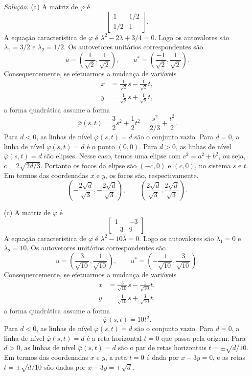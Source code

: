 \documentclass[a4paper,11pt]{article}
\begin{document}
\emph{Solução.}
(a)
A matriz de $\varphi$ é
\[
  \begin{bmatrix}
    1 & 1/2 \\
    1/2 & 1
  \end{bmatrix}.
\]
A equação característica de $\varphi$ é $\lambda^2 - 2\lambda + 3/4 = 0$.
Logo os autovalores são $\lambda_1 = 3/2$ e $\lambda_2 = 1/2$.
Os autovetores unitários correspondentes são
\[
  u = \left( \frac{1}{\sqrt{2}}, \frac{1}{\sqrt{2}} \right), \qquad u^* = \left( \frac{-1}{\sqrt{2}}, \frac{1}{\sqrt{2}} \right).
\]
Consequentemente, se efetuarmos a mudança de variáveis
\begin{align*}
  x & = \frac{1}{\sqrt{2}} s - \frac{1}{\sqrt{2}} t, \\
  y & = \frac{1}{\sqrt{2}} s + \frac{1}{\sqrt{2}} t,
\end{align*}
a forma quadrática assume a forma
\[
  \overline{\varphi}(s,t) = \frac{3}{2} s^2 + \frac{1}{2} t^2 = \frac{s^2}{2/3} + \frac{t^2}{2}.
\]
Para $d < 0$, as linhas de nível $\overline{\varphi}(s,t) = d$ são o conjunto vazio.
Para $d = 0$, a linha de nível $\overline{\varphi}(s,t) = d$ é o ponto $(0,0)$.
Para $d > 0$, as linhas de nível $\overline{\varphi}(s,t) = d$ são elipses.
Nesse caso, temos uma elipse com $c^2 = a^2 + b^2$, ou seja, $c = 2 \sqrt{2d/3}$.
Portanto os focos da elipse são $(-c,0)$ e $(c,0)$, no sistema $s$ e $t$.
Em termos das coordenadas $x$ e $y$, os focos são, respectivamente,
\[
  \left( -\frac{2\sqrt{d}}{\sqrt{3}}, -\frac{2\sqrt{d}}{\sqrt{3}} \right), \qquad \left( \frac{2\sqrt{d}}{\sqrt{3}}, \frac{2\sqrt{d}}{\sqrt{3}} \right).
\]

(c)
A matriz de $\varphi$ é
\[
  \begin{bmatrix}
    1 & -3 \\
    -3 & 9
  \end{bmatrix}.
\]
A equação característica de $\varphi$ é $\lambda^2 - 10\lambda = 0$.
Logo os autovalores são $\lambda_1 = 0$ e $\lambda_2 = 10$.
Os autovetores unitários correspondentes são
\[
  u = \left( \frac{3}{\sqrt{10}}, \frac{1}{\sqrt{10}} \right), \qquad u^* = \left( -\frac{1}{\sqrt{10}}, \frac{3}{\sqrt{10}} \right).
\]
Consequentemente, se efetuarmos a mudança de variáveis
\begin{align*}
  x & = \frac{3}{\sqrt{10}} s - \frac{1}{\sqrt{10}} t, \\
  y & = \frac{1}{\sqrt{10}} s + \frac{3}{\sqrt{10}} t,
\end{align*}
a forma quadrática assume a forma
\[
  \overline{\varphi}(s,t) = 10 t^2.
\]
Para $d < 0$, as linhas de nível $\overline{\varphi}(s,t) = d$ são o conjunto vazio.
Para $d = 0$, a linha de nível $\overline{\varphi}(s,t) = d$ é a reta horizontal $t = 0$ que passa pela origem.
Para $d > 0$, as linhas de nível $\overline{\varphi}(s,t) = d$ são o par de retas horizontais $t = \pm \sqrt{d/10}$.
Em termos das coordenadas $x$ e $y$, a reta $t = 0$ é dada por $x - 3y = 0$, e as retas $t = \pm \sqrt{d/10}$ são dadas por $x - 3y = \mp \sqrt{d}$.
\end{document}
